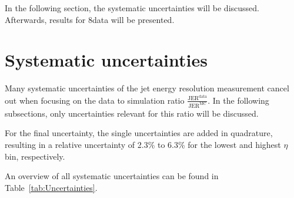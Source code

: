 In the following section, the systematic uncertainties will be discussed. 
Afterwards, results for 8\tev data will be presented.



\FloatBarrier
\chapter{Systematic uncertainties}

Many systematic uncertainties of the jet energy resolution measurement cancel out when focusing on the data to simulation ratio $\frac{\text{JER}^{\text{data}}}{\text{JER}^{\text{MC}}}$.
In the following subsections, only uncertainties relevant for this ratio will be discussed.

For the final uncertainty, the single uncertainties are added in quadrature, 
resulting in a relative uncertainty of 2.3\% to 6.3\% for the lowest and highest $\eta$ bin, respectively. 

An overview of all systematic uncertainties can be found in Table~\ref{tab:Uncertainties}.



